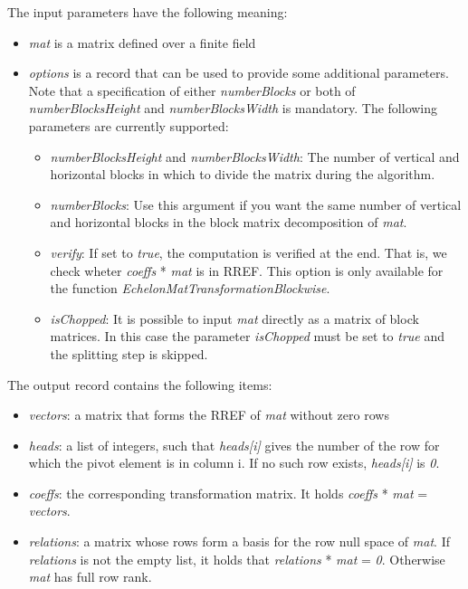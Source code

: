 \documentclass[a4paper,11pt]{report}
\begin{document}
{{{ The input parameters have the following meaning: 
\begin{itemize}
\item  \emph{mat} is a matrix defined over a finite field 
\item  \emph{options} is a record that can be used to provide some additional parameters. Note that
a specification of either \emph{numberBlocks} or both of \emph{numberBlocksHeight} and \emph{numberBlocksWidth} is mandatory. The following parameters are currently supported: 
\begin{itemize}
\item  \emph{numberBlocksHeight} and \emph{numberBlocksWidth}: The number of vertical and horizontal blocks in which to divide the matrix
during the algorithm. 
\item  \emph{numberBlocks}: Use this argument if you want the same number of vertical and horizontal
blocks in the block matrix decomposition of \emph{mat}. 
\item  \emph{verify}: If set to \emph{true}, the computation is verified at the end. That is, we check wheter \emph{coeffs} * \emph{mat} is in RREF. This option is only available for the function \emph{EchelonMatTransformationBlockwise}. 
\item  \emph{isChopped}: It is possible to input \emph{mat} directly as a matrix of block matrices. In this case the parameter \emph{isChopped} must be set to \emph{true} and the splitting step is skipped. 
\end{itemize}
 
\end{itemize}
 

 The output record contains the following items: 
\begin{itemize}
\item  \emph{vectors}: a matrix that forms the RREF of \emph{mat} without zero rows 
\item  \emph{heads}: a list of integers, such that \emph{heads[i]} gives the number of the row for which the pivot element is in column i. If no
such row exists, \emph{heads[i]} is \emph{0}. 
\item  \emph{coeffs}: the corresponding transformation matrix. It holds \emph{coeffs} * \emph{mat} = \emph{vectors}. 
\item  \emph{relations}: a matrix whose rows form a basis for the row null space of \emph{mat}. If \emph{relations} is not the empty list, it holds that \emph{relations} * \emph{mat} = \emph{0}. Otherwise \emph{mat} has full row rank. 
\end{itemize}
 

}}}
\end{document}
